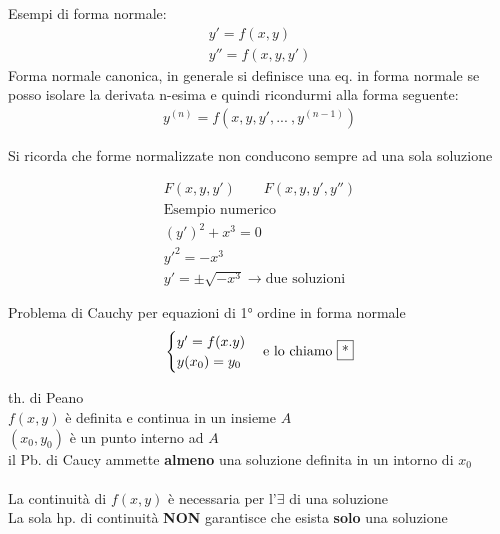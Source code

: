 \documentclass[a4paper, oneside]{article}
\begin{document}
\begin{definition}
    Esempi di forma normale:
    \begin{align}
        y' = f(x, y)
        \\y'' = f(x, y, y')
    \end{align}
    Forma normale canonica, in generale si definisce una eq. in forma normale se posso isolare la derivata n-esima e quindi ricondurmi alla forma seguente:
    \begin{align*}
        y^{(n)} = f(x, y, y', ...\ , y^{(n-1)})
    \end{align*}

    Si ricorda che forme normalizzate non conducono sempre ad una sola soluzione
    \begin{example}
        \begin{align}
            F(x, y, y') \qquad
            F(x, y, y', y'')
            \\\text{Esempio numerico}
            \\(y')^2 + x^3 = 0
            \\y'^2 = -x^3
            \\y' = \pm \sqrt{-x^3} \to \text{due soluzioni}
        \end{align}
    \end{example}
\end{definition}

\begin{proposition}
    Problema di Cauchy per equazioni di 1° ordine in forma normale
    \begin{align}
        \begin{cases}
            y' = f(x.y)       \\  
            y(x_0) = y_0
        \end{cases}
        \text{e lo chiamo \fbox{*}} 
    \end{align}
\end{proposition}

\begin{theorem}
    th. di Peano
    \\ $f(x,y)$ è definita e continua in un insieme $A$
    \\ $(x_0, y_0)$ è un punto interno ad $A$
    \\ il Pb. di Caucy \fbox{*} ammette \textbf{almeno} una soluzione definita in un intorno di $x_0$
    \\\\La continuità di $f(x, y)$ è necessaria per l'$\exists$ di una soluzione
    \\La sola hp. di continuità \textbf{NON} garantisce che esista \textbf{solo} una soluzione
\end{theorem}
\end{document}
